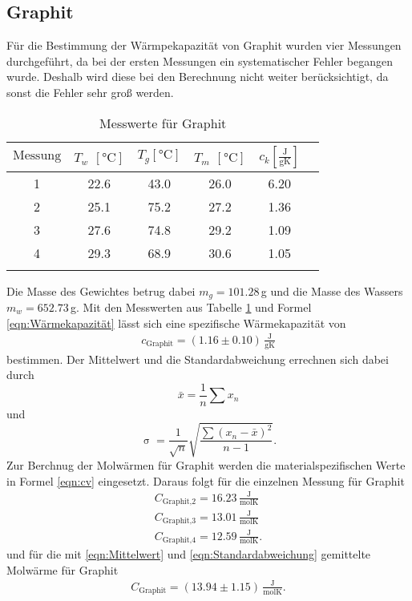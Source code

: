 \subsection{Graphit}
Für die Bestimmung der Wärmpekapazität von Graphit wurden vier Messungen durchgeführt,
da bei der ersten Messungen ein systematischer Fehler begangen wurde. Deshalb wird diese
bei den Berechnung nicht weiter berücksichtigt, da sonst die Fehler sehr groß werden.
\newline
\begin{table}
  \centering
  \caption{Messwerte für Graphit}
  \begin{tabular}{c c c c c c}
    \toprule
    $\text{Messung}$ & $T_w$ $[\si{\degreeCelsius}]$ & $T_g$$ [\si{\degreeCelsius}]$ & $T_m$ $[\si{\degreeCelsius}]$ &  $c_k[\frac{\text{J}}{\text{gK}}]$\\
    \midrule
     1 & 22.6 & 43.0 & 26.0 & 6.20\\
     2 & 25.1 & 75.2 & 27.2 & 1.36\\
     3 & 27.6 & 74.8 & 29.2 & 1.09\\
     4 & 29.3 & 68.9 & 30.6 & 1.05\\
    \bottomrule
    \label{fig:graphit}
  \end{tabular}
\end{table}
\newline
Die Masse des Gewichtes betrug dabei $m_g=101.28$\,g und die Masse des Wassers $m_w=652.73$\,g.
Mit den Messwerten aus Tabelle \ref{fig:graphit} und Formel \ref{eqn:Wärmekapazität}
lässt sich eine spezifische Wärmekapazität von
\begin{align*}
  c_{\text{Graphit}} = (1.16\pm 0.10)\, \frac{\text{J}}{\text{gK}}
\end{align*}
bestimmen.
Der Mittelwert und die Standardabweichung errechnen sich dabei durch
\begin{equation}
  \bar{x} = \frac{1}{n} \sum{x_n}
  \label{eqn:Mittelwert}
\end{equation}
und
\begin{equation}
\upsigma = \frac{1}{\sqrt{n}} \sqrt{\frac{\sum{(x_n - \bar{x})^2}}{n-1} }.
\label{eqn:Standardabweichung}
\end{equation}
Zur Berchnug der Molwärmen für Graphit werden die materialspezifischen Werte in
Formel \ref{eqn:cv} eingesetzt. Daraus folgt für die einzelnen Messung für Graphit
\begin{align*}
 C_{\text{Graphit,2}} = 16.23\, \frac{\text{J}}{\text{molK}} \\
 C_{\text{Graphit,3}} = 13.01\, \frac{\text{J}}{\text{molK}} \\
 C_{\text{Graphit,4}} = 12.59\, \frac{\text{J}}{\text{molK}}.
\end{align*}
und für die mit \ref{eqn:Mittelwert} und \ref{eqn:Standardabweichung} gemittelte
Molwärme für Graphit
\begin{align*}
  C_{\text{Graphit}} = (13.94\pm 1.15)\, \frac{\text{J}}{\text{molK}}.
\end{align*}

